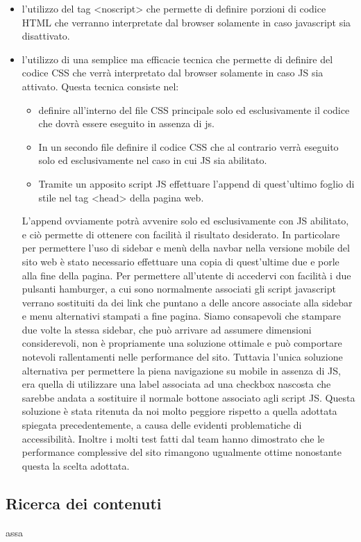 \documentclass[12pt]{article}
\begin{document}
	\begin{itemize}
			\item l'utilizzo del tag <noscript> che permette di definire porzioni di codice HTML che verranno interpretate dal browser solamente in caso javascript sia disattivato.
			\item l'utilizzo di una semplice ma efficacie tecnica che permette di definire del codice CSS che verrà interpretato dal browser solamente in caso JS sia attivato. Questa tecnica consiste nel:
			\begin{itemize}
				\item definire all'interno del file CSS principale solo ed esclusivamente il codice che dovrà essere eseguito in assenza di js.
				\item In un secondo file definire il codice CSS che al contrario verrà eseguito solo ed esclusivamente nel caso in cui JS sia abilitato.
				\item Tramite un apposito script JS effettuare l'append di  quest'ultimo foglio di stile nel tag <head> della pagina web.
			\end{itemize}
			L'append ovviamente potrà avvenire solo ed esclusivamente con JS abilitato, e ciò permette di ottenere con facilità il risultato desiderato.
			In particolare per permettere l'uso di sidebar e menù della navbar nella versione mobile del sito web è stato necessario effettuare una copia di quest'ultime due e porle alla fine della pagina. Per permettere all'utente di accedervi con facilità i due pulsanti hamburger, a cui sono normalmente associati gli script javascript verrano sostituiti da dei link che puntano a delle ancore associate alla sidebar e menu alternativi stampati a fine pagina.
			Siamo consapevoli che stampare due volte la stessa sidebar, che può arrivare ad assumere dimensioni considerevoli, non è propriamente una soluzione ottimale e può comportare notevoli rallentamenti nelle performance del sito. Tuttavia l'unica soluzione alternativa per permettere la piena navigazione su mobile in assenza di JS, era quella di utilizzare una label associata ad una checkbox nascosta che sarebbe andata a sostituire il normale bottone associato agli script JS. Questa soluzione è stata ritenuta da noi molto peggiore rispetto a quella adottata spiegata precedentemente, a causa delle evidenti problematiche di accessibilità. 
			Inoltre i molti test fatti dal team hanno dimostrato che le performance complessive del sito rimangono ugualmente ottime nonostante questa la scelta adottata.
	\end{itemize}
	\subsection{Ricerca dei contenuti}
	assa
\end{document}
